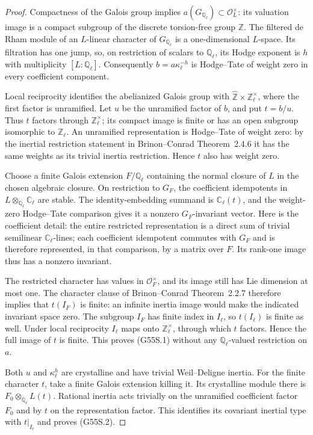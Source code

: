 \begin{proof}
Compactness of the Galois group implies
$a(G_{\mathbb Q_\ell})\subset\mathcal O_L^\times$:
its valuation image is a compact subgroup of
the discrete torsion-free group $\mathbb Z$.
The filtered de Rham module of an $L$-linear
character of $G_{\mathbb Q_\ell}$ is a
one-dimensional $L$-space.
Its filtration has one jump, so, on restriction
of scalars to $\mathbb Q_\ell$, its Hodge exponent
is $h$ with multiplicity $[L:\mathbb Q_\ell]$.
Consequently
$b=a\kappa_\ell^{-h}$ is Hodge--Tate of weight zero
in every coefficient component.

Local reciprocity identifies the abelianized
Galois group with
$\widehat{\mathbb Z}\times\mathbb Z_\ell^\times$,
where the first factor is unramified.
Let $u$ be the unramified factor of $b$, and put
$t=b/u$.
Thus $t$ factors through $\mathbb Z_\ell^\times$;
its compact image is finite or has an open
subgroup isomorphic to $\mathbb Z_\ell$.
An unramified representation is Hodge--Tate
of weight zero: by the inertial restriction
statement in Brinon--Conrad Theorem~2.4.6 it
has the same weights as its trivial inertia
restriction.  Hence $t$ also has weight zero.

Choose a finite Galois extension
$F/\mathbb Q_\ell$ containing the normal closure
of $L$ in the chosen algebraic closure.
On restriction to $G_F$, the coefficient
idempotents in
$L\otimes_{\mathbb Q_\ell}\mathbb C_\ell$
are stable.
The identity-embedding summand is
$\mathbb C_\ell(t)$, and the weight-zero
Hodge--Tate comparison gives it a nonzero
$G_F$-invariant vector.
Here is the coefficient detail: the entire
restricted representation is a direct sum of
trivial semilinear $\mathbb C_\ell$-lines;
each coefficient idempotent commutes with $G_F$
and is therefore represented, in that comparison,
by a matrix over $F$.
Its rank-one image thus has a nonzero invariant.

The restricted character has values in
$\mathcal O_F^\times$, and its image still has
Lie dimension at most one.
The character clause of Brinon--Conrad
Theorem~2.2.7 therefore implies that
$t(I_F)$ is finite: an infinite inertia image
would make the indicated invariant space zero.
The subgroup $I_F$ has finite index in $I_\ell$,
so $t(I_\ell)$ is finite as well.
Under local reciprocity $I_\ell$ maps onto
$\mathbb Z_\ell^\times$, through which $t$
factors.  Hence the full image of $t$ is finite.
This proves (G55S.1) without any
$\mathbb Q_\ell$-valued restriction on $a$.

Both $u$ and $\kappa_\ell^h$ are crystalline
and have trivial Weil--Deligne inertia.
For the finite character $t$, take a finite
Galois extension killing it.
Its crystalline module there is
$F_0\otimes_{\mathbb Q_\ell}L(t)$.
Rational inertia acts trivially on the
unramified coefficient factor $F_0$ and by
$t$ on the representation factor.
This identifies its covariant inertial type
with $t|_{I_\ell}$ and proves (G55S.2).
\end{proof}

